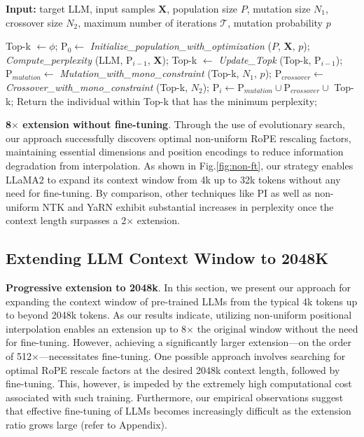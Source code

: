 \begin{algorithm}[t]
	\small
	\caption{The search algorithm}
	\textbf{Input:} target LLM, input samples $\mathbf{X}$, population size $P$, mutation size $N_1$, crossover size $N_2$, maximum number of iterations $\mathcal{T}$, mutation probability $p$\\

	\begin{algorithmic}[1]
		\label{alg:search}
		\STATE Top-k $\leftarrow \phi$;
		\STATE $\text{P}_0 \leftarrow$ \textit{Initialize\_population\_with\_optimization} ($P$, $\mathbf{X}$, $p$);
		\STATE \textit{Compute\_perplexity} (LLM, $\text{P}_{i-1}$, $\mathbf{X}$);
		\STATE Top-k $\leftarrow$ \textit{Update\_Topk} (Top-k, $\text{P}_{i-1}$);
		\STATE $\text{P}_{mutation} \leftarrow$ \textit{Mutation\_with\_mono\_constraint} (Top-k, $N_1$, $p$);
		\STATE $\text{P}_{crossover} \leftarrow$ \textit{Crossover\_with\_mono\_constraint} (Top-k, $N_2$);
		\STATE $\text{P}_i \leftarrow \text{P}_{mutation} \cup \text{P}_{crossover} \cup$ Top-k;
		\ENDFOR
		\STATE Return the individual within Top-k that has the minimum perplexity;
	\end{algorithmic}
\end{algorithm}

\textbf{8$\times$ extension without fine-tuning}. Through the use of evolutionary search, our approach successfully discovers optimal non-uniform RoPE rescaling factors, maintaining essential dimensions and position encodings to reduce information degradation from interpolation. As shown in Fig.\ref{fig:non-ft}, our strategy enables LLaMA2 to expand its context window from 4k up to 32k tokens without any need for fine-tuning. By comparison, other techniques like PI as well as non-uniform NTK and YaRN exhibit substantial increases in perplexity once the context length surpasses a 2$\times$ extension.

\subsection{Extending LLM Context Window to 2048K}
\label{sec:extendto2048k}

\textbf{Progressive extension to 2048k}. In this section, we present our approach for expanding the context window of pre-trained LLMs from the typical 4k tokens up to beyond 2048k tokens. As our results indicate, utilizing non-uniform positional interpolation enables an extension up to 8$\times$ the original window without the need for fine-tuning. However, achieving a significantly larger extension—on the order of 512$\times$—necessitates fine-tuning. One possible approach involves searching for optimal RoPE rescale factors at the desired 2048k context length, followed by fine-tuning. This, however, is impeded by the extremely high computational cost associated with such training. Furthermore, our empirical observations suggest that effective fine-tuning of LLMs becomes increasingly difficult as the extension ratio grows large (refer to Appendix).

